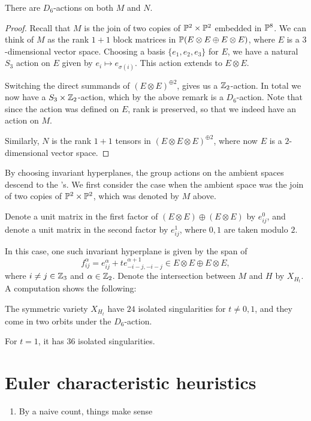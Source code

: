 \begin{lemma}
There are $D_6$-actions on both $M$ and $N$.
\end{lemma}
\begin{proof}
Recall that $M$ is the join of two copies of $\P^2 \times \P^2$ embedded in $\P^8$. We can think of $M$ as the rank $1+1$ block matrices in $\P(E \otimes E \oplus E \otimes E)$, where $E$ is a $3$-dimensional vector space. Choosing a basis $\{e_1,e_2,e_3\}$ for $E$, we have a natural $S_3$ action on $E$ given by $e_i \mapsto e_{\sigma(i)}$. This action extends to $E \otimes E$. 

Switching the direct summands of ${\left(E \otimes E\right)}^{\oplus 2}$, gives us a $\Z_2$-action. In total we now have a $S_3 \times \Z_2$-action, which by the above remark is a $D_6$-action. Note that since the action was defined on $E$, rank is preserved, so that we indeed have an action on $M$.

Similarly, $N$ is the rank $1+1$ tensors in ${\left(E \otimes E \otimes E \right)}^{\oplus 2}$, where now $E$ is a $2$-dimensional vector space. 
\end{proof}


By choosing invariant hyperplanes, the group actions on the ambient spaces descend to the \CY's. We first consider the case when the ambient space was the join of two copies of $\P^2 \times \P^2$, which was denoted by $M$ above.

Denote a unit matrix in the first factor of $(E \otimes E) \oplus (E \otimes E)$ by $e_{ij}^0$, and denote a unit matrix in the second factor by $e_{ij}^1$, where $0,1$ are taken modulo $2$. 

In this case, one such invariant hyperplane is given by the span of
$$
f_{ij}^\alpha = e_{ij}^\alpha + t e_{-i-j,-i-j}^{\alpha+1} \in E\otimes E \oplus E \otimes E,
$$
where $i \neq j \in \Z_3$ and $\alpha \in \Z_2$. Denote the intersection between $M$ and $H$ by $X_{H_t}$. A \MM computation shows the following:

\begin{proposition}
The symmetric variety $X_{H_t}$ have $24$ isolated singularities for $t \neq 0,1$, and they come in two orbits under the $D_6$-action.

For $t=1$, it has $36$ isolated singularities.
\end{proposition}

\section{Euler characteristic heuristics}

\begin{enumerate}
	\item By a naive count, things make sense
\end{enumerate}

